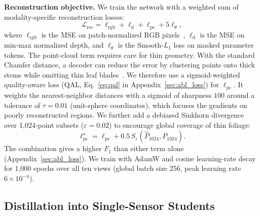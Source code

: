 \documentclass[10pt,twocolumn,letterpaper]{article}
\begin{document}
\noindent\textbf{Reconstruction objective.}
We train the network with a weighted sum of modality-specific reconstruction losses:
\begin{equation}
  \mathcal{L}_{\mathrm{rec}} = \ell_{\mathrm{rgb}} + \ell_{\mathrm{d}} + \ell_{\mathrm{pc}} + 5\ell_\theta,
  \label{eq:reconstruction-loss}
\end{equation}
where $\ell_{\mathrm{rgb}}$ is the MSE on patch-normalized RGB pixels~\citep{he2022mae}, $\ell_{\mathrm{d}}$ is the MSE on min-max normalized depth, and $\ell_\theta$ is the Smooth-$L_1$ loss on masked parameter tokens. The point-cloud term requires care for thin geometry. With the standard Chamfer distance, a decoder can reduce the error by clustering points onto thick stems while omitting thin leaf blades~\citep{wu2021dcd,song2026structural}. We therefore use a sigmoid-weighted quality-aware loss (QAL, Eq.~\eqref{eq:qal} in Appendix~\ref{sec:abl_loss}) for $\ell_{\mathrm{pc}}$. It weights the nearest-neighbor distances with a sigmoid of sharpness $100$ around a tolerance of $\tau = 0.01$ (unit-sphere coordinates), which focuses the gradients on poorly reconstructed regions. We further add a debiased Sinkhorn divergence~\citep{feydy2019sinkhorn} over 1{,}024-point subsets ($\varepsilon = 0.02$) to encourage global coverage of thin foliage:
\begin{equation}
  \ell_{\mathrm{pc}}^{\star} = \ell_{\mathrm{pc}} + 0.5\,S_{\varepsilon}\!\left(\hat P_{1024}, P_{1024}\right).
  \label{eq:point-loss-sinkhorn}
\end{equation}
The combination gives a higher $F_1$ than either term alone (Appendix~\ref{sec:abl_loss}). We train with AdamW and cosine learning-rate decay for 1{,}000 epochs over all ten views (global batch size 256, peak learning rate $6 \times 10^{-4}$).

\subsection{Distillation into Single-Sensor Students}
\label{sec:distill}\label{sec:method-distill}
\end{document}
